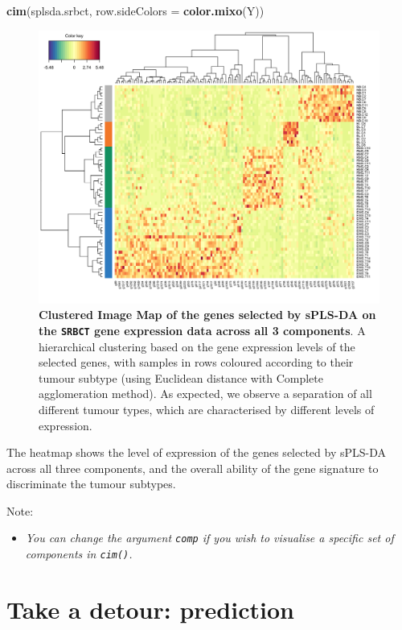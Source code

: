 \documentclass[]{book}
\newenvironment{Shaded}{\begin{snugshade}}{\end{snugshade}}
\newcommand{\KeywordTok}[1]{\textcolor[rgb]{0.13,0.29,0.53}{\textbf{#1}}}
\newcommand{\DataTypeTok}[1]{\textcolor[rgb]{0.13,0.29,0.53}{#1}}
\newcommand{\NormalTok}[1]{#1}
\providecommand{\tightlist}{%
  \setlength{\itemsep}{0pt}\setlength{\parskip}{0pt}}
\begin{document}
\begin{Shaded}
\begin{Highlighting}[]
\KeywordTok{cim}\NormalTok{(splsda.srbct, }\DataTypeTok{row.sideColors =} \KeywordTok{color.mixo}\NormalTok{(Y))}
\end{Highlighting}
\end{Shaded}

\begin{figure}

{\centering \includegraphics[width=0.5\linewidth]{Figures/PLSDA/splsda-cim-1} 

}

\caption{\textbf{Clustered Image Map of the genes selected by
sPLS-DA on the \texttt{SRBCT} gene expression data across all 3
components}. A hierarchical clustering based on the gene expression
levels of the selected genes, with samples in rows coloured according to
their tumour subtype (using Euclidean distance with Complete
agglomeration method). As expected, we observe a separation of all
different tumour types, which are characterised by different levels of
expression.}\label{fig:splsda-cim}
\end{figure}










The heatmap shows the level of expression of the genes selected by
sPLS-DA across all three components, and the overall ability of the gene
signature to discriminate the tumour subtypes.

Note:

\begin{itemize}
\tightlist
\item
  \emph{You can change the argument \texttt{comp} if you wish to
  visualise a specific set of components in \texttt{cim()}.}
\end{itemize}

\section{Take a detour: prediction}\label{detour:plsda:predict}
\end{document}
